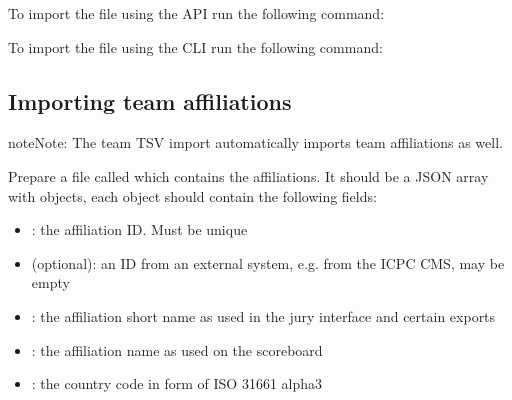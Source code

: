 \documentclass[a4paper,10pt,english,openany]{sphinxmanual}
\begin{document}
\sphinxAtStartPar
To import the file using the API run the following command:

\begin{sphinxVerbatim}[commandchars=\\\{\}]
      
\end{sphinxVerbatim}

\sphinxAtStartPar
To import the file using the CLI run the following command:

\begin{sphinxVerbatim}[commandchars=\\\{\}]
      
\end{sphinxVerbatim}


\subsection{Importing team affiliations}
\label{\detokenize{import:importing-team-affiliations}}
\begin{sphinxadmonition}{note}{Note:}
\sphinxAtStartPar
The team TSV import automatically imports team affiliations as well.
\end{sphinxadmonition}

\sphinxAtStartPar
Prepare a file called  which contains the affiliations.
It should be a JSON array with objects, each object should contain the following
fields:
\begin{itemize}
\item {} 
\sphinxAtStartPar
{}: the affiliation ID. Must be unique

\item {} 
\sphinxAtStartPar
{} (optional): an ID from an external system, e.g. from the ICPC CMS, may be empty

\item {} 
\sphinxAtStartPar
{}: the affiliation short name as used in the jury interface and certain
exports

\item {} 
\sphinxAtStartPar
{}: the affiliation name as used on the scoreboard

\item {} 
\sphinxAtStartPar
{}: the country code in form of ISO 3166\sphinxhyphen{}1 alpha\sphinxhyphen{}3

\end{itemize}
\end{document}
